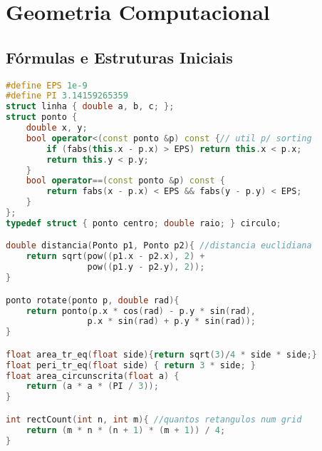 \chapter{Geometria Computacional}
\section{Fórmulas e Estruturas Iniciais}
\begin{lstlisting}[language=C++]
#define EPS 1e-9
#define PI 3.14159265359
struct linha { double a, b, c; };
struct ponto {
	double x, y;
    bool operator<(const ponto &p) const {// util p/ sorting
    	if (fabs(this.x - p.x) > EPS) return this.x < p.x;
        return this.y < p.y;
    }
    bool operator==(const ponto &p) const {
    	return fabs(x - p.x) < EPS && fabs(y - p.y) < EPS;
    }
};
typedef struct { ponto centro; double raio; } circulo;

double distancia(Ponto p1, Ponto p2){ //distancia euclidiana
	return sqrt(pow((p1.x - p2.x), 2) + 
    			pow((p1.y - p2.y), 2));
}

ponto rotate(ponto p, double rad){
	return ponto(p.x * cos(rad) - p.y * sin(rad),
    			p.x * sin(rad) + p.y * sin(rad));
}

float area_tr_eq(float side){return sqrt(3)/4 * side * side;}
float peri_tr_eq(float side) { return 3 * side; }
float area_circunscrita(float a) {
    return (a * a * (PI / 3));
}

int rectCount(int n, int m){ //quantos retangulos num grid
    return (m * n * (n + 1) * (m + 1)) / 4;
}
\end{lstlisting}

